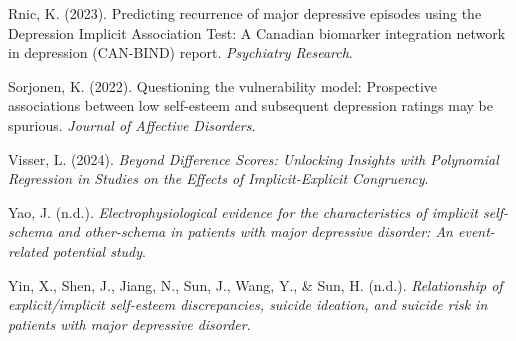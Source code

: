 \documentclass[
  man,
  longtable,
  nolmodern,
  notxfonts,
  notimes,
  colorlinks=true,linkcolor=blue,citecolor=blue,urlcolor=blue]{apa7}
\newlength{\cslhangindent}
\newenvironment{CSLReferences}[2] %
 {\begin{list}{}{%
  \setlength{\itemindent}{0pt}
  \setlength{\leftmargin}{0pt}
  \setlength{\parsep}{0pt}
  \ifodd #1
   \setlength{\leftmargin}{\cslhangindent}
   \setlength{\itemindent}{-1\cslhangindent}
  \fi
  \setlength{\itemsep}{#2\baselineskip}}}
 {\end{list}}
\begin{document}
\begin{CSLReferences}{1}{0}
Rnic, K. (2023). Predicting recurrence of major depressive episodes
using the {Depression} {Implicit} {Association} {Test}: {A} {Canadian}
biomarker integration network in depression ({CAN}-{BIND}) report.
\emph{Psychiatry Research}.

Sorjonen, K. (2022). Questioning the vulnerability model: {Prospective}
associations between low self-esteem and subsequent depression ratings
may be spurious. \emph{Journal of Affective Disorders}.

Visser, L. (2024). \emph{Beyond {Difference} {Scores}: {Unlocking}
{Insights} with {Polynomial} {Regression} in {Studies} on the {Effects}
of {Implicit}-{Explicit} {Congruency}}.

Yao, J. (n.d.). \emph{Electrophysiological evidence for the
characteristics of implicit self-schema and other-schema in patients
with major depressive disorder: {An} event-related potential study}.

Yin, X., Shen, J., Jiang, N., Sun, J., Wang, Y., \& Sun, H. (n.d.).
\emph{Relationship of explicit/implicit self‐esteem discrepancies,
suicide ideation, and suicide risk in patients with major depressive
disorder}.

\end{CSLReferences}
\end{document}
